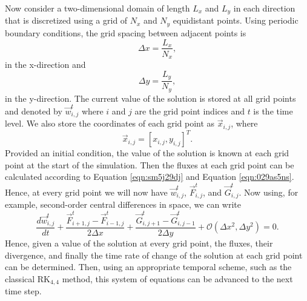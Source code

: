 Now consider a two-dimensional domain of length $L_x$ and $L_y$ in each direction that is discretized using a grid of $N_x$ and $N_y$ equidistant points. Using periodic boundary conditions, the grid spacing between adjacent points is
\begin{equation}
	\Delta x = \frac{L_x}{N_x},
\end{equation}
in the x-direction and
\begin{equation}
	\Delta y = \frac{L_y}{N_y},
\end{equation}
in the y-direction. The current value of the solution is stored at all grid points and denoted by $\vec{w}_{i,j}^t$ where $i$ and $j$ are the grid point indices and $t$ is the time level. We also store the coordinates of each grid point as $\vec{x}_{i,j}$, where 
\begin{equation}
	\vec{x}_{i,j} = [x_{i,j},y_{i,j}]^T.
\end{equation}
Provided an initial condition, the value of the solution is known at each grid point at the start of the simulation. Then the fluxes at each grid point can be calculated according to Equation \ref{eqn:sm5j29dj} and Equation \ref{eqn:029as5ns}. Hence, at every grid point we will now have $\vec{w}_{i,j}^t$, $\vec{F}_{i,j}^t$, and $\vec{G}_{i,j}^t$. Now using, for example, second-order central differences in space, we can write
\begin{equation}
	\frac{d \vec{w}_{i,j}^t}{d t} + \frac{\vec{F}_{i+1,j}^t-\vec{F}_{i-1,j}^t}{2\Delta x} + \frac{\vec{G}_{i,j+1}^t-\vec{G}_{i,j-1}^t}{2\Delta y} + \mathcal{O}(\Delta x^2,\Delta y^2) = 0.
\end{equation}
Hence, given a value of the solution at every grid point, the fluxes, their divergence, and finally the time rate of change of the solution at each grid point can be determined. Then, using an appropriate temporal scheme, such as the classical RK$_{4,4}$ method, this system of equations can be advanced to the next time step.

